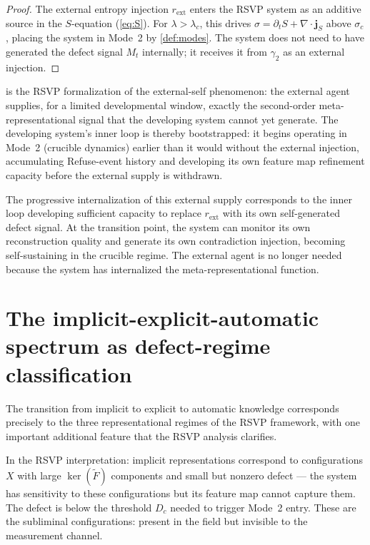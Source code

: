 \documentclass[12pt, oneside]{memoir}
\newcommand{\Ft}{\widetilde{F}}
\begin{document}
\begin{proof}
The external entropy injection $r_{\mathrm{ext}}$ enters the RSVP system as an additive
source in the $S$-equation (\cref{eq:S}).  For $\lambda > \lambda_c$, this drives
$\sigma = \partial_t S + \nabla \cdot \mathbf{j}_S$ above $\sigma_c$, placing the system in
Mode~2 by \cref{def:modes}.  The system does not need to have generated the defect
signal $M_t$ internally; it receives it from $\gamma_2$ as an external injection.
\end{proof}

 is the RSVP formalization of the external-self phenomenon: the
external agent supplies, for a limited developmental window, exactly the second-order
meta-representational signal that the developing system cannot yet generate.  The
developing system's inner loop is thereby bootstrapped: it begins operating in Mode~2
(crucible dynamics) earlier than it would without the external injection, accumulating
Refuse-event history and developing its own feature map refinement capacity before the
external supply is withdrawn.

The progressive internalization of this external supply corresponds to the inner loop
developing sufficient capacity to replace $r_{\mathrm{ext}}$ with its own self-generated
defect signal.  At the transition point, the system can monitor its own reconstruction
quality and generate its own contradiction injection, becoming self-sustaining in the
crucible regime.  The external agent is no longer needed because the system has
internalized the meta-representational function.

\section{The implicit-explicit-automatic spectrum as defect-regime classification}
\label{sec:impl-expl-auto}

The transition from implicit to explicit to automatic knowledge corresponds precisely
to the three representational regimes of the RSVP framework, with one important
additional feature that the RSVP analysis clarifies.

In the RSVP interpretation: implicit representations correspond to configurations $X$
with large $\ker(\Ft)$ components and small but nonzero defect — the system has
sensitivity to these configurations but its feature map cannot capture them.  The defect
is below the threshold $D_c$ needed to trigger Mode~2 entry.  These are the subliminal
configurations: present in the field but invisible to the measurement channel.
\end{document}
